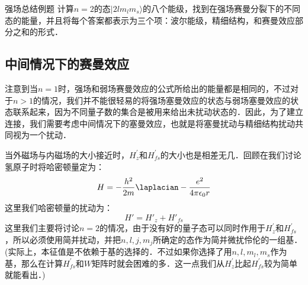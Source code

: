 \begin{example}{强场总结例题}
计算$n=2$的态$|2lm_lm_s\rangle$的八个能级，找到在强场赛曼分裂下的不同态的能量，并且将每个答案都表示为三个项：波尔能级，精细结构，和赛曼效应部分之和的形式．

\end{example}
\subsection{中间情况下的赛曼效应}
注意到当$n=1$时，强场和弱场赛曼效应的公式所给出的能量都是相同的，不过对于$n > 1$的情况，我们并不能很轻易的将强场塞曼效应的状态与弱场塞曼效应的状态联系起来，因为不同量子数的集合是被用来给出未扰动状态的．因此，为了建立连接，我们需要考虑中间情况下的塞曼效应，也就是将塞曼扰动与精细结构扰动共同视为一个扰动．

当外磁场与内磁场的大小接近时，$H_z^{'}$和$H_{fs}^{'}$的大小也是相差无几．回顾在我们讨论氢原子时将哈密顿量定为：\begin{equation}
H=-\frac{h^2}{2m}\laplacian-\frac{e^2}{4\pi\epsilon_0 r}
\end{equation}
这里我们哈密顿量的扰动为：
\begin{equation}
H'=H'_z+H'_{fs}
\end{equation}
这里我们主要将讨论$n=2$的情况，由于没有好的量子态可以同时作用于$H_z^{'}$和$H_{fs}^{'}$，所以必须使用简并扰动，并把$n,l,j,m_j$所确定的态作为简并微扰伶伦的一组基．(实际上，本征值是不依赖于基的选择的．不过如果你选择了用$n,l,m_l,m_s$作为基，那么在计算$H_{fs}^{'}$和$W$矩阵时就会困难的多．这一点我们从$H_z^{'}$比起$H_{fs}^{'}$较为简单就能看出．)


